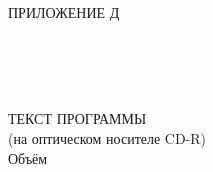 \begin{ESKDtitlePage}
  \begin{flushright}
    ПРИЛОЖЕНИЕ Д \enspace
  \end{flushright}
  
  \begin{center}
    \envDiplomEducation \\
    \envDiplomUniversity \\
    \envDiplomCathedra \\
  \end{center}

  \vfill

  \begin{center}
    ТЕКСТ ПРОГРАММЫ \\
    (на оптическом носителе CD-R) \\
    Объём~\envDiplomDiskSize \\
  \end{center}

  \vfill

  \begin{center}
    \envCode \\
  \end{center}

  \vfill

  

  \vfill

  \begin{center}
    \ESKDtheYear
  \end{center}
\end{ESKDtitlePage}
